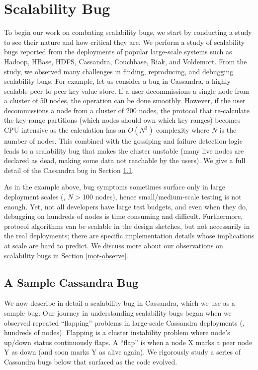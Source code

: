 \section{Scalability Bug}
\label{sec-sck-observe}

To begin our work on combating scalability bugs, we start by conducting a study
to see their nature and how critical they are.
%
We perform a study of
\totAll scalability bugs reported from the deployments
of popular large-scale systems such as
Hadoop,
HBase,
HDFS,
Cassandra,
Couchbase,
Riak, and
Voldemort.
%
From the study, we observed many challenges in finding, reproducing, and
debugging scalability bugs. For example, let us consider a bug in Cassandra, a
highly-scalable peer-to-peer key-value store. If a user decommissions a single
node from a cluster of 50 nodes, the operation can be done smoothly. However, if
the user decommissions a node from a cluster of 200 nodes, the protocol that
re-calculate the key-range partitions (which nodes should own which key ranges)
becomes CPU intensive as the calculation has an $O(N^3)$ complexity where $N$ is
the number of nodes.  This combined with the gossiping and failure detection
logic leads to a scalability bug that makes the cluster unstable (many live
nodes are declared as dead, making some data not reachable by the users). We
give a full detail of the Cassandra bug in Section \ref{mot-bug}.

%
As in the example above, bug symptoms sometimes surface only in large deployment
scales (\eg, $N$$>$100 nodes), hence small/medium-scale testing is not enough.
Yet, not all developers have large test budgets, and even when they do,
debugging on hundreds of nodes is time consuming and difficult.
%
Furthermore, protocol algorithms can be scalable in the design sketches, but not
necessarily in the real deployments; there are specific implementation details
whose implications at scale are hard to predict. We discuss more about our
observations on scalability bugs in Section \ref{mot-observe}.

\subsection{A Sample Cassandra Bug}
\label{mot-bug}



We now describe in detail a scalability bug in Cassandra, which we use as a
sample bug.
%
Our journey in understanding scalability bugs began when we observed repeated
``flapping'' problems in large-scale Cassandra deployments (\ie, hundreds of
nodes).
%
Flapping is a cluster instability problem where node's up/down status
continuously flaps.  A ``flap'' is when a node X marks a peer node Y as down
(and soon marks Y as alive again).
%
We rigorously study a series of Cassandra bugs below that surfaced as the code
evolved.

